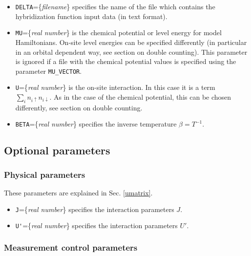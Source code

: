 \documentclass[aps,prb,floatfix,superscriptaddress,twocolumn,notitlepage]{revtex4-1}
\begin{document}
\begin{itemize}
\item \verb#DELTA#=\{\emph{filename}\} specifies the name of the file which contains the hybridization function input data (in text format).
\item \verb#MU#=\{\emph{real number}\} is the chemical potential or level energy for model Hamiltonians. On-site level energies can be specified differently (in particular in an orbital dependent way, see section on double counting). This parameter is ignored if a file with the chemical potential values is specified using the parameter \verb#MU_VECTOR#.
\item \verb#U#=\{\emph{real number}\} is the on-site interaction. In this case it is a term $\sum_i n_{i\uparrow}n_{i\downarrow}$. As in the case of the chemical potential, this can be chosen differently, see section on double counting.
\item \verb#BETA#=\{\emph{real number}\} specifies the inverse temperature $\beta=T^{-1}$.
\end{itemize}

\subsection{Optional parameters}

\subsubsection{Physical parameters}

These parameters are explained in Sec. \ref{umatrix}.
\begin{itemize}
\item \verb#J#=\{\emph{real number}\} specifies the interaction parameters $J$.
\item \verb#U'#=\{\emph{real number}\} specifies the interaction parameters $U'$.
\end{itemize}

\subsubsection{Measurement control parameters}
\end{document}
